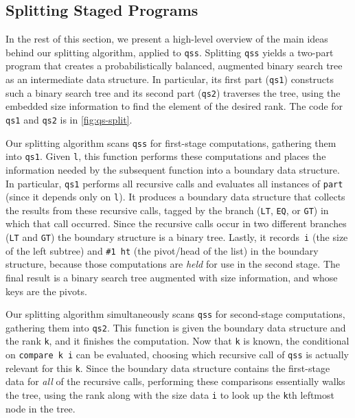 \begin{abstrsyn}
\subsection{Splitting Staged Programs}



In the rest of this section, we present a high-level overview of the main ideas
behind our splitting algorithm, applied to \texttt{qss}.
%
Splitting \texttt{qss} yields a two-part program that creates a
probabilistically balanced, augmented binary search tree 
as an intermediate data structure. In
particular, its first part (\texttt{qs1}) constructs such a binary search tree
and its second part (\texttt{qs2}) traverses the tree, using the embedded size
information to find the element of the desired rank.
%
The code for \texttt{qs1} and \texttt{qs2} is in \ref{fig:qs-split}.


Our splitting algorithm scans \texttt{qss} for first-stage computations,
gathering them into \texttt{qs1}. Given \texttt{l}, this function performs these
computations and places the information needed by the subsequent function into a
boundary data structure.
%
In particular, \texttt{qs1} performs all recursive calls and evaluates all
instances of \texttt{part} (since it depends only on \texttt{l}). It
produces a boundary data structure that collects the results from these
recursive calls, tagged by the branch (\texttt{LT}, \texttt{EQ}, or \texttt{GT})
in which that call occurred. Since the recursive calls occur in two different
branches (\texttt{LT} and \texttt{GT}) the boundary structure is a binary tree.  
%
Lastly, it records~\texttt{i} (the size of the left subtree) and \texttt{\#1 ht}
(the pivot/head of the list) in the boundary structure, because those
computations are \emph{held} for use in the second stage.
%
The final result is a binary search tree augmented with size information, and
whose keys are the pivots.

Our splitting algorithm simultaneously scans \texttt{qss} for second-stage
computations, gathering them into \texttt{qs2}. This function is given the boundary
data structure and the rank \texttt{k}, and it finishes the computation. Now that
\texttt{k} is known, the conditional on \texttt{compare k i} can be evaluated,
choosing which recursive call of \texttt{qss} is actually relevant for this
\texttt{k}. Since the boundary data structure contains the first-stage data for
\emph{all} of the recursive calls, performing these comparisons essentially
walks the tree, using the rank along with the size data \texttt{i} to
look up the \texttt{k}th leftmost node in the tree.


\end{abstrsyn}
